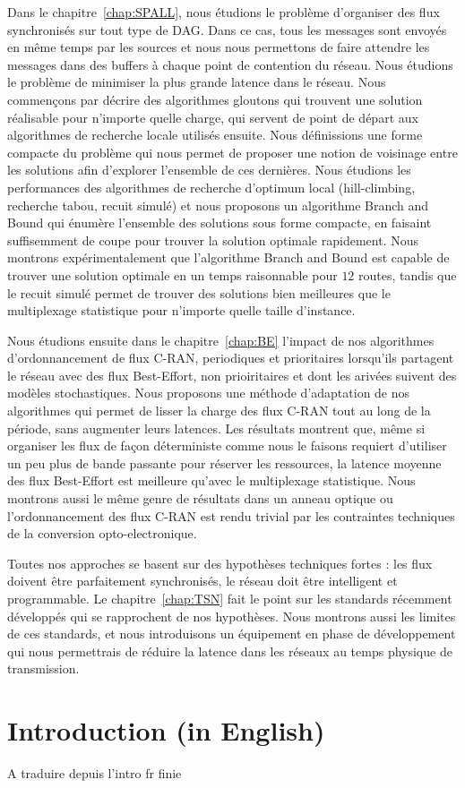 Dans le chapitre~\ref{chap:SPALL}, nous étudions le problème d'organiser des flux synchronisés sur tout type de DAG. Dans ce cas, tous les messages sont envoyés en même temps par les sources et nous nous permettons de faire attendre les messages dans des buffers à chaque point de contention du réseau. Nous étudions le problème de minimiser la plus grande latence dans le réseau. Nous commençons par décrire des algorithmes gloutons qui trouvent une solution réalisable pour n'importe quelle charge, qui servent de point de départ aux algorithmes de recherche locale utilisés ensuite. Nous définissions une forme compacte du problème qui nous permet de proposer une notion de voisinage entre les solutions afin d'explorer l'ensemble de ces dernières. Nous étudions les performances des algorithmes de recherche d'optimum local (hill-climbing, recherche tabou, recuit simulé) et nous proposons un algorithme Branch and Bound qui énumère l'ensemble des solutions sous forme compacte, en faisaint  suffisemment de coupe pour trouver la solution optimale rapidement. Nous montrons expérimentalement que l'algorithme Branch and Bound est capable de trouver une solution optimale en un temps raisonnable pour $12$ routes, tandis que le recuit simulé permet de trouver des solutions bien meilleures que le multiplexage statistique pour n'importe quelle taille d'instance.

Nous étudions ensuite dans le chapitre~\ref{chap:BE} l'impact de nos algorithmes d'ordonnancement de flux C-RAN, periodiques et prioritaires lorsqu'ils partagent le réseau avec des flux Best-Effort, non prioiritaires et dont les arivées suivent des modèles stochastiques. Nous proposons une méthode d'adaptation de nos algorithmes qui permet de lisser la charge des flux C-RAN tout au long de la période, sans augmenter leurs latences. Les résultats montrent que, même si organiser les flux de façon déterministe comme nous le faisons requiert d'utiliser un peu plus de bande passante pour réserver les ressources, la latence moyenne des flux Best-Effort est meilleure qu'avec le multiplexage statistique. Nous montrons aussi le même genre de résultats dans un anneau optique ou l'ordonnancement des flux C-RAN est rendu trivial par les contraintes techniques de la conversion opto-electronique.

Toutes nos approches se basent sur des hypothèses techniques fortes : les flux doivent être parfaitement synchronisés, le réseau doit être intelligent et programmable. Le chapitre~\ref{chap:TSN} fait le point sur les standards récemment développés qui se rapprochent de nos hypothèses. Nous montrons aussi les limites de ces standards, et nous introduisons un équipement en phase de développement qui nous permettrais de réduire la latence dans les réseaux au temps physique de transmission.




\chapter*{Introduction (in English)}
\label{chap:introen}
A traduire depuis l'intro fr finie